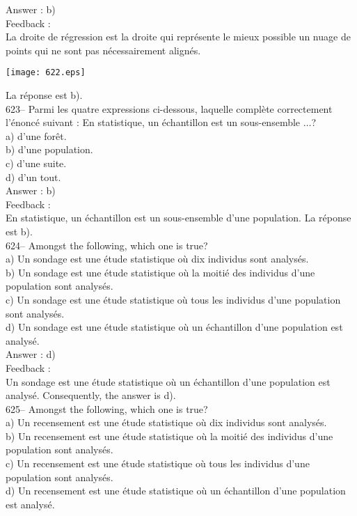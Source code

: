 ﻿\documentclass[letterpaper, 12pt]{article}
\begin{document}
Answer : b)\\

Feedback : \\
La droite de r\'egression est la droite qui repr\'esente le mieux
possible un nuage de points qui ne sont pas n\'ecessairement
align\'es.   \begin{center}
    \texttt{[image: 622.eps]}
    \end{center}  La r\'eponse
est b).\\


623-- Parmi les quatre expressions ci-dessous, laquelle compl\`ete
correctement l'\'enonc\'e suivant : \og En statistique, un
\'echantillon est un sous-ensemble $\ldots$\fg ?\\
a) d'une for\^et.\\
b) d'une population.\\
c) d'une suite.\\
d) d'un tout.\\

Answer : b)\\

Feedback : \\
En statistique, un \'echantillon est un sous-ensemble d'une population.  La
r\'eponse est b).\\

624-- Amongst the following, which one is true?\\
a) Un sondage est une \'etude statistique o\`u dix individus sont
analys\'es.\\
b) Un sondage est une \'etude statistique o\`u la moiti\'e des individus
d'une population sont analys\'es.\\
c) Un sondage est une \'etude statistique o\`u tous les individus d'une
population sont analys\'es.\\
d) Un sondage est une \'etude statistique o\`u un \'echantillon d'une
population est analys\'e.\\

Answer : d)\\

Feedback : \\
Un sondage est une \'etude statistique o\`u un \'echantillon d'une
population est analys\'e.  Consequently, the answer is d).\\

625-- Amongst the following, which one is true?\\
a) Un recensement est une \'etude statistique o\`u dix individus sont
analys\'es.\\
b) Un recensement est une \'etude statistique o\`u la moiti\'e des individus
d'une population sont analys\'es.\\
c) Un recensement est une \'etude statistique o\`u tous les individus d'une
population sont analys\'es.\\
d) Un recensement est une \'etude statistique o\`u un \'echantillon d'une
population est analys\'e.\\
\end{document}
